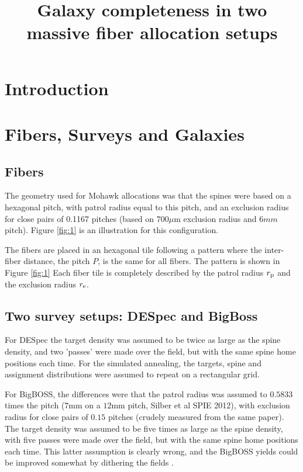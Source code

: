 \documentclass{article}
\title{Galaxy completeness in two massive fiber allocation setups}
\begin{document}
\maketitle
\section{Introduction}

\section{Fibers, Surveys and Galaxies}

\subsection{Fibers}

The geometry used for Mohawk allocations was that the spines were based on
a hexagonal pitch, with patrol radius equal to this pitch, and an
exclusion radius for close pairs of 0.1167 pitches (based on 700$\mu$m 
exclusion radius and $6mm$ pitch). Figure \ref{fig:1} is an
illustration for this configuration. 



The fibers are placed in an hexagonal tile following a pattern where
the inter-fiber distance, the pitch $P$, is the same for all
fibers. The pattern is shown in Figure \ref{fig:1} Each fiber tile is
completely  described by the patrol radius $r_{\rm
  p}$ and the exclusion radius $r_{\rm e}$.


\subsection{Two survey setups: DESpec and BigBoss}
\label{sec:setups}


For DESpec the target density was assumed to be twice as large as the spine
density, and two 'passes' were made over the field, but with the same
spine home positions each time.  For the simulated annealing, the
targets, spine and assignment distributions were assumed to repeat on
a rectangular grid. 

For BigBOSS, the differences were that the patrol radius was assumed to
$0.5833$ times the pitch ($7$mm on a $12$mm pitch, Silber et al SPIE
2012), with exclusion radius for close pairs of $0.15$ pitches (crudely
measured from the same paper). The target density was assumed to be
five times as large as the spine density, with five passes were made
over the field, but with the same spine home positions each time. This
latter assumption is clearly wrong, and the BigBOSS yields could be
improved somewhat by dithering the fields . 
\end{document}
